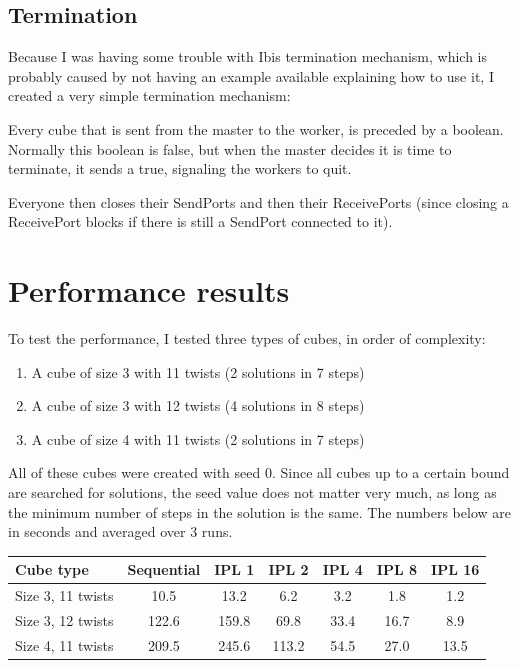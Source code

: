 \documentclass[11pt,a4paper]{article}
\begin{document}
\subsection{Termination}
Because I was having some trouble with Ibis termination mechanism, which is probably caused by not having an example available explaining how to use it, I created a very simple termination mechanism:

Every cube that is sent from the master to the worker, is preceded by a boolean. Normally this boolean is false, but when the master decides it is time to terminate, it sends a true, signaling the workers to quit.

Everyone then closes their SendPorts and then their ReceivePorts (since closing a ReceivePort blocks if there is still a SendPort connected to it).

\section{Performance results}
To test the performance, I tested three types of cubes, in order of complexity:
\begin{enumerate}
\item A cube of size 3 with 11 twists (2 solutions in 7 steps)
\item A cube of size 3 with 12 twists (4 solutions in 8 steps)
\item A cube of size 4 with 11 twists (2 solutions in 7 steps)
\end{enumerate}
All of these cubes were created with seed 0. Since all cubes up to a certain bound are searched for solutions, the seed value does not matter very much, as long as the minimum number of steps in the solution is the same. The numbers below are in seconds and averaged over 3 runs. \\

\begin{tabular}{ | l | S | S | S | S | S | S | }
	\hline
	\textbf{Cube type} & \textbf{Sequential} & \textbf{IPL 1} & \textbf{IPL 2} & \textbf{IPL 4} & \textbf{IPL 8} & \textbf{IPL 16} \\
	\hline                       
	Size 3, 11 twists & 10.5 & 13.2 & 6.2 & 3.2 & 1.8 & 1.2 \\
	\hline
	Size 3, 12 twists & 122.6 & 159.8 & 69.8 & 33.4 & 16.7 & 8.9 \\
	\hline
	Size 4, 11 twists & 209.5 & 245.6 & 113.2 & 54.5 & 27.0 & 13.5 \\
	\hline
\end{tabular} \\
\end{document}
